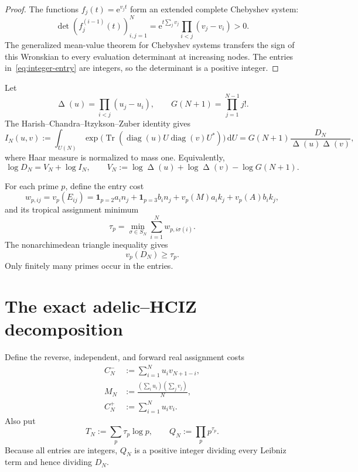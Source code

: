 \documentclass[11pt]{article}
\newcommand{\Tr}{\operatorname{Tr}}
\newcommand{\diag}{\operatorname{diag}}
\newcommand{\DeltaV}{\mathop{\Delta}\nolimits}
\newcommand{\dd}{\,\mathrm d}
\newcommand{\e}{\mathrm e}
\newcommand{\1}{\mathbf 1}
\theoremstyle{plain}
\theoremstyle{definition}
\theoremstyle{remark}
\begin{document}
\begin{proof}
The functions $f_j(t)=\e^{v_jt}$ form an extended complete Chebyshev system:
\[
 \det(f_j^{(i-1)}(t))_{i,j=1}^N
 =\e^{t\sum_jv_j}\prod_{i<j}(v_j-v_i)>0.
\]
The generalized mean-value theorem for Chebyshev systems transfers the sign
of this Wronskian to every evaluation determinant at increasing nodes.  The
entries in~\eqref{eq:integer-entry} are integers, so the determinant is a
positive integer.
\end{proof}

Let
\[
 \DeltaV(u)=\prod_{i<j}(u_j-u_i),\qquad
 G(N+1)=\prod_{j=1}^{N-1}j!.
\]
The Harish--Chandra--Itzykson--Zuber identity gives
\begin{equation}\label{eq:HCIZ-identity}
 I_N(u,v):=\int_{U(N)}
 \exp\!\bigl(\Tr(\diag(u)U\diag(v)U^*)\bigr)\dd U
 =G(N+1)\frac{D_N}{\DeltaV(u)\DeltaV(v)},
\end{equation}
where Haar measure is normalized to mass one.  Equivalently,
\begin{equation}\label{eq:logD-HCIZ}
 \log D_N=V_N+\log I_N,
 \qquad
 V_N:=\log\DeltaV(u)+\log\DeltaV(v)-\log G(N+1).
\end{equation}

For each prime $p$, define the entry cost
\begin{equation}\label{eq:local-cost}
 w_{p,ij}=v_p(E_{ij})
 =\1_{p=2}a_in_j+\1_{p=3}b_in_j
   +v_p(M)a_ik_j+v_p(A)b_ik_j,
\end{equation}
and its tropical assignment minimum
\begin{equation}\label{eq:taup}
 \tau_p=\min_{\sigma\in S_N}\sum_{i=1}^Nw_{p,i\sigma(i)}.
\end{equation}
The nonarchimedean triangle inequality gives
\begin{equation}\label{eq:tropical-lower}
 v_p(D_N)\ge\tau_p.
\end{equation}
Only finitely many primes occur in the entries.

\section{The exact adelic--HCIZ decomposition}\label{sec:adelic-hciz}

Define the reverse, independent, and forward real assignment costs
\begin{align}
 C_N^-&:=\sum_{i=1}^Nu_i v_{N+1-i},\label{eq:Cminus}\\
 M_N&:=\frac{(\sum_i u_i)(\sum_jv_j)}{N},\label{eq:Mmean}\\
 C_N^+&:=\sum_{i=1}^Nu_iv_i.\label{eq:Cplus}
\end{align}
Also put
\begin{equation}\label{eq:tropical-total}
 T_N:=\sum_p\tau_p\log p,
 \qquad
 Q_N:=\prod_pp^{\tau_p}.
\end{equation}
Because all entries are integers, $Q_N$ is a positive integer dividing every
Leibniz term and hence dividing $D_N$.
\end{document}
